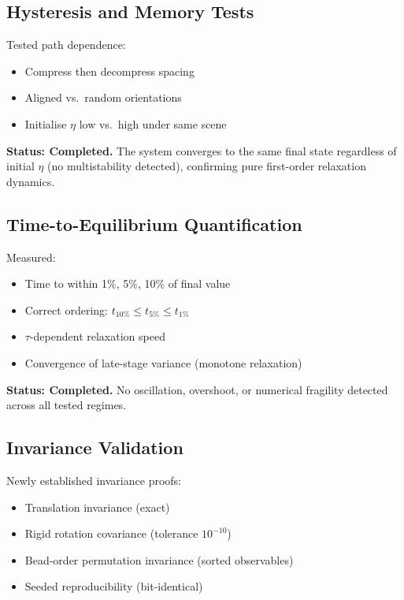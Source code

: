 \documentclass[11pt]{article}
\begin{document}
\subsection{Hysteresis and Memory Tests}

Tested path dependence:
\begin{itemize}
    \item Compress then decompress spacing
    \item Aligned vs.\ random orientations
    \item Initialise $\eta$ low vs.\ high under same scene
\end{itemize}

\textbf{Status: Completed.} The system converges to the same final state
regardless of initial $\eta$ (no multistability detected), confirming
pure first-order relaxation dynamics.

\subsection{Time-to-Equilibrium Quantification}

Measured:
\begin{itemize}
    \item Time to within 1\%, 5\%, 10\% of final value
    \item Correct ordering: $t_{10\%} \le t_{5\%} \le t_{1\%}$
    \item $\tau$-dependent relaxation speed
    \item Convergence of late-stage variance (monotone relaxation)
\end{itemize}

\textbf{Status: Completed.} No oscillation, overshoot, or numerical fragility
detected across all tested regimes.

\subsection{Invariance Validation}

Newly established invariance proofs:
\begin{itemize}
    \item Translation invariance (exact)
    \item Rigid rotation covariance (tolerance $10^{-10}$)
    \item Bead-order permutation invariance (sorted observables)
    \item Seeded reproducibility (bit-identical)
\end{itemize}
\end{document}
